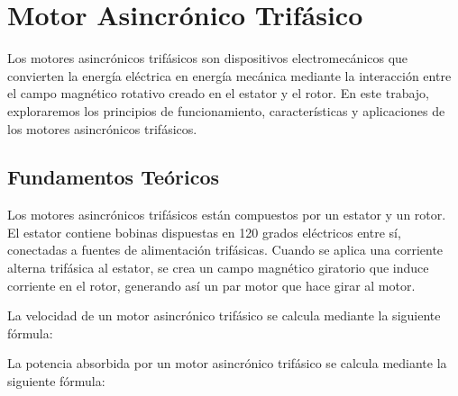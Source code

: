 \documentclass[../main]{subfiles}
\begin{document}
\section*{Motor Asincrónico Trifásico}

Los motores asincrónicos trifásicos son dispositivos electromecánicos que convierten la energía eléctrica en energía mecánica mediante la interacción entre el campo magnético rotativo creado en el estator y el rotor. En este trabajo, exploraremos los principios de funcionamiento, características y aplicaciones de los motores asincrónicos trifásicos.

\subsection*{Fundamentos Teóricos}

Los motores asincrónicos trifásicos están compuestos por un estator y un rotor. El estator contiene bobinas dispuestas en 120 grados eléctricos entre sí, conectadas a fuentes de alimentación trifásicas. Cuando se aplica una corriente alterna trifásica al estator, se crea un campo magnético giratorio que induce corriente en el rotor, generando así un par motor que hace girar al motor.

La velocidad de un motor asincrónico trifásico se calcula mediante la siguiente fórmula:


La potencia absorbida por un motor asincrónico trifásico se calcula mediante la siguiente fórmula:

\end{document}
